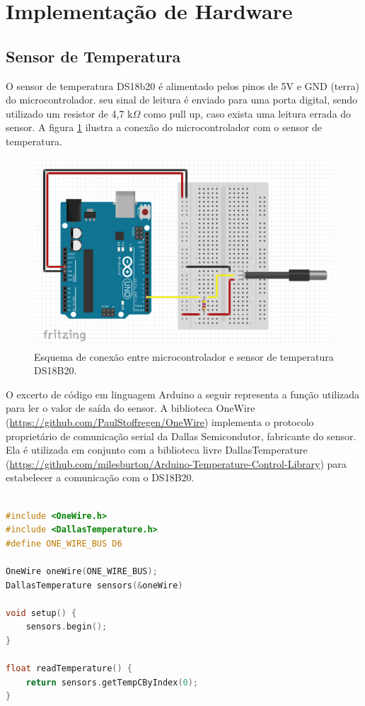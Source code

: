 \section{Implementação de Hardware}

\subsection{Sensor de Temperatura}

O sensor de temperatura DS18b20 é alimentado pelos pinos de 5V e GND (terra) do microcontrolador. seu sinal de leitura é enviado para uma porta digital, sendo utilizado um resistor de 4,7 k$\Omega$ como pull up, caso exista uma leitura errada do sensor. A figura \ref{fig:micro_temp} ilustra a conexão do microcontrolador com o sensor de temperatura. 


\begin{figure}[h]
    \centering
    \includegraphics[scale=0.40]{figuras/implementacao/hardware/DSsensor.png}
    \caption{Esquema de conexão entre microcontrolador e sensor de temperatura DS18B20.}
    \label{fig:micro_temp}
\end{figure}


O excerto de código em linguagem Arduino a seguir representa a função utilizada para ler o valor de saída do sensor. A biblioteca OneWire (\url{https://github.com/PaulStoffregen/OneWire}) implementa o protocolo proprietário de comunicação serial da Dallas Semicondutor, fabricante do sensor. Ela é utilizada em conjunto com a biblioteca livre DallasTemperature (\url{https://github.com/milesburton/Arduino-Temperature-Control-Library}) para estabelecer a comunicação com o DS18B20.

\begin{lstlisting}[language=C]

#include <OneWire.h>
#include <DallasTemperature.h>
#define ONE_WIRE_BUS D6

OneWire oneWire(ONE_WIRE_BUS);
DallasTemperature sensors(&oneWire)

void setup() {
    sensors.begin();
}

float readTemperature() {
    return sensors.getTempCByIndex(0);
}

\end{lstlisting}


